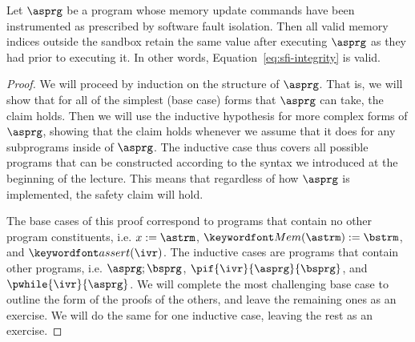 \documentclass[11pt,twoside]{scrartcl}
\begin{document}
\begin{theorem}
\label{thm:sfi-correctness}
Let $\asprg$ be a program whose memory update commands have been instrumented as prescribed by software fault isolation. Then all valid memory indices outside the sandbox retain the same value after executing $\asprg$ as they had prior to executing it. In other words, Equation~\ref{eq:sfi-integrity} is valid.
\end{theorem}
\begin{proof}
We will proceed by induction on the structure of $\asprg$. That is, we will show that for all of the simplest (base case) forms that $\asprg$ can take, the claim holds. Then we will use the inductive hypothesis for more complex forms of $\asprg$, showing that the claim holds whenever we assume that it does for any subprograms inside of $\asprg$. The inductive case thus covers all possible programs that can be constructed according to the syntax we introduced at the beginning of the lecture. This means that regardless of how $\asprg$ is implemented, the safety claim will hold.

The base cases of this proof correspond to programs that contain no other program constituents, i.e. $x:=\astrm$, $\pderef{\astrm}:=\bstrm$, and $\passert{\ivr}$. The inductive cases are programs that contain other programs, i.e. $\asprg;\bsprg$, $\pif{\ivr}{\asprg}{\bsprg}$, and $\pwhile{\ivr}{\asprg}$. We will complete the most challenging base case to outline the form of the proofs of the others, and leave the remaining ones as an exercise. We will do the same for one inductive case, leaving the rest as an exercise.


\end{proof}
\end{document}

